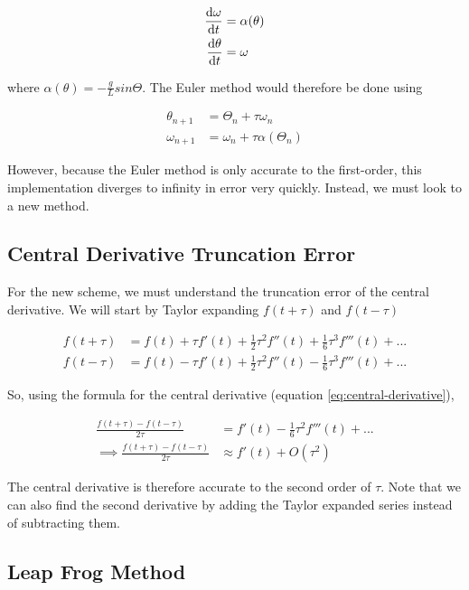 \documentclass[]{article}
\begin{document}
\begin{align*}
	\dv{\omega}{t} &= \alpha(\theta)\\
	\dv{\theta}{t} &= \omega
\end{align*} 

where $\alpha(\theta) = -\frac{g}{L} sin\Theta$. The Euler method would therefore be done using

\begin{align*}
	\theta_{n+1} &= \Theta_n + \tau\omega_n\\
	\omega_{n+1} &= \omega_n + \tau\alpha(\Theta_{n})
\end{align*}

However, because the Euler method is only accurate to the first-order, this implementation diverges to infinity in error very quickly. Instead, we must look to a new method.

\subsection{Central Derivative Truncation Error}\bigbreak

For the new scheme, we must understand the truncation error of the central derivative. We will start by Taylor expanding $f(t+\tau)$ and $f(t - \tau)$

\begin{align*}
	f(t+\tau) &= f(t) + \tau f'(t) + \frac{1}{2}\tau^2f''(t) + \frac{1}{6}\tau^3f'''(t) + ...\\
	f(t-\tau) &= f(t) - \tau f'(t) + \frac{1}{2}\tau^2f''(t) - \frac{1}{6}\tau^3f'''(t) + ...
\end{align*}

So, using the formula for the central derivative (equation \ref{eq:central-derivative}),

\begin{align*}
	\frac{f(t+\tau) - f(t-\tau)}{2\tau} &= f'(t) - \frac{1}{6}\tau^2f'''(t) + ...\\
	\implies \frac{f(t+\tau) - f(t-\tau)}{2\tau} &\approx f'(t) + O(\tau^2)
\end{align*}

The central derivative is therefore accurate to the second order of $\tau$. Note that we can also find the second derivative by adding the Taylor expanded series instead of subtracting them.\\

\subsection{Leap Frog Method}\bigbreak
\end{document}
